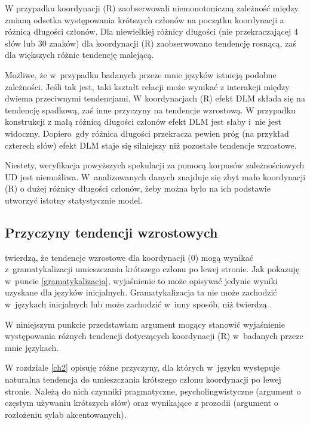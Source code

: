W przypadku koordynacji (R) \cite{przepiorkowski2024argument} zaobserwowali niemonotoniczną zależność między zmianą odsetka występowania krótszych członów na początku koordynacji a różnicą długości członów. Dla niewielkiej różnicy długości (nie przekraczającej 4 słów lub 30 znaków) dla koordynacji (R) zaobserwowano tendencję rosnącą, zaś dla większych różnic tendencję malejącą. 

Możliwe, że w~przypadku badanych przeze mnie języków istnieją podobne zależności. Jeśli tak jest, taki kształt relacji  może wynikać z interakcji między dwiema przeciwnymi tendencjami. W koordynacjach (R) efekt DLM składa się na tendencję spadkową, zaś inne przyczyny na tendencje wzrostową. W przypadku konstrukcji z małą różnicą długości członów efekt DLM jest słaby i~nie jest widoczny. Dopiero~gdy różnica długości przekracza pewien próg (na przykład czterech słów) efekt DLM staje się silniejszy niż pozostałe tendencje wzrostowe.

Niestety, weryfikacja powyższych spekulacji za pomocą korpusów zależnościowych UD jest niemożliwa. W~analizowanych danych znajduje się zbyt mało koordynacji (R) o dużej różnicy długości członów, żeby można było na ich podstawie utworzyć istotny statystycznie model.

\subsection{Przyczyny tendencji wzrostowych}

\cite{przepiorkowski2023conjunct} twierdzą, że tendencje wzrostowe dla koordynacji (0) mogą wynikać z~gramatykalizacji umieszczania krótszego członu po lewej stronie. Jak pokazuję w~puncie \ref{gramatykalizacja}, wyjaśnienie to może opisywać jedynie wyniki uzyskane dla języków inicjalnych. Gramatykalizacja ta nie może zachodzić w~językach inicjalnych lub może zachodzić w~inny sposób, niż twierdzą \cite{przepiorkowski2023conjunct}.

W niniejszym punkcie przedstawiam argument mogący stanowić wyjaśnienie występowania różnych tendencji dotyczących koordynacji (R) w~badanych przeze mnie językach.

W rozdziale \ref{ch2} opisuję różne przyczyny, dla których w~języku występuje naturalna tendencja do umieszczania krótszego członu koordynacji po lewej stronie. Należą do nich czynniki pragmatyczne, psycholingwistyczne (argument o częstym używaniu krótszych słów) oraz  wynikające z prozodii (argument o rozłożeniu sylab akcentowanych). 

